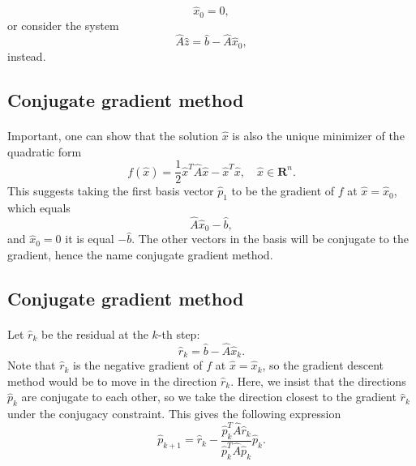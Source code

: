 \documentclass[%
twoside,                 %
final,                   %
10pt]{article}
\begin{document}
\begin{equation*}
\hat{x}_0=0,
\end{equation*}
or consider the system
\begin{equation*}
\hat{A}\hat{z} = \hat{b}-\hat{A}\hat{x}_0,
\end{equation*}
instead.




\subsection*{Conjugate gradient method}

\paragraph{}
Important, one can show that the solution $\hat{x}$ is also the unique minimizer of the quadratic form
\begin{equation*}
  f(\hat{x}) = \frac{1}{2}\hat{x}^T\hat{A}\hat{x} - \hat{x}^T \hat{x} , \quad \hat{x}\in\mathbf{R}^n. 
\end{equation*}
This suggests taking the first basis vector $\hat{p}_1$ 
to be the gradient of $f$ at $\hat{x}=\hat{x}_0$, 
which equals
\begin{equation*}
\hat{A}\hat{x}_0-\hat{b},
\end{equation*}
and 
$\hat{x}_0=0$ it is equal $-\hat{b}$.
The other vectors in the basis will be conjugate to the gradient, 
hence the name conjugate gradient method.




\subsection*{Conjugate gradient method}

\paragraph{}
Let  $\hat{r}_k$ be the residual at the $k$-th step:
\begin{equation*}
\hat{r}_k=\hat{b}-\hat{A}\hat{x}_k.
\end{equation*}
Note that $\hat{r}_k$ is the negative gradient of $f$ at 
$\hat{x}=\hat{x}_k$, 
so the gradient descent method would be to move in the direction $\hat{r}_k$. 
Here, we insist that the directions $\hat{p}_k$ are conjugate to each other, 
so we take the direction closest to the gradient $\hat{r}_k$  
under the conjugacy constraint. 
This gives the following expression
\begin{equation*}
\hat{p}_{k+1}=\hat{r}_k-\frac{\hat{p}_k^T \hat{A}\hat{r}_k}{\hat{p}_k^T\hat{A}\hat{p}_k} \hat{p}_k.
\end{equation*}
\end{document}
